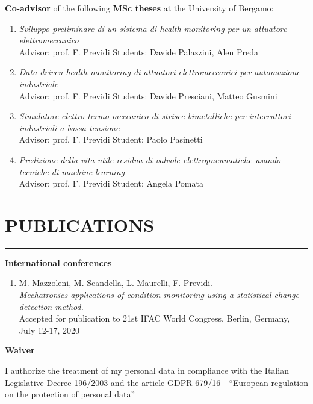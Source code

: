 \documentclass[10pt]{article}
\newcommand{\cvsection}[1]{\section*{\centering\normalsize\uppercase{#1}}\vspace{-16pt}\rule{\linewidth}{0.2pt}\vspace{6pt}}
\begin{document}
\vspace{6pt} %

\textbf{Co-advisor} of the following \textbf{MSc theses} at the University of Bergamo:
\begin{enumerate}
	\setlength\itemsep{-3pt}
	\item \textit{Sviluppo preliminare di un sistema di health monitoring per un attuatore elettromeccanico}\\
	Advisor: prof. F. Previdi \hfill Students: Davide Palazzini, Alen Preda
	\item \textit{Data-driven health monitoring di attuatori elettromeccanici per automazione industriale}\\
	Advisor: prof. F. Previdi \hfill Students: Davide Presciani, Matteo Gusmini
	\item \textit{Simulatore elettro-termo-meccanico di strisce bimetalliche per interruttori industriali a bassa tensione}\\
	Advisor: prof. F. Previdi \hfill Student: Paolo Pasinetti
	\item \textit{Predizione della vita utile residua di valvole elettropneumatiche usando tecniche di machine learning}\\
	Advisor: prof. F. Previdi \hfill Student: Angela Pomata
\end{enumerate}


\cvsection{publications}

\textbf{International conferences}
\begin{enumerate}
	\setlength\itemsep{-3pt}
	\item M. Mazzoleni, M. Scandella, L. Maurelli, F. Previdi.\\
	\textit{Mechatronics applications of condition monitoring using a statistical change detection method.}\\
	Accepted for publication to 21st IFAC World Congress, Berlin, Germany, July 12-17, 2020
\end{enumerate}

\vfill
{\centering \textbf{Waiver} \par}
I authorize the treatment of my personal data in compliance with the Italian Legislative Decree 196/2003 and the article GDPR 679/16 - “European regulation on the protection of personal data”
\end{document}
